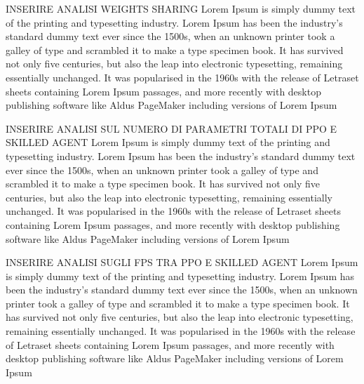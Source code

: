 


INSERIRE ANALISI WEIGHTS SHARING
Lorem Ipsum is simply dummy text of the printing and typesetting industry. Lorem Ipsum has been the industry's standard dummy text ever since the 1500s, when an unknown printer took a galley of type and scrambled it to make a type specimen book. It has survived not only five centuries, but also the leap into electronic typesetting, remaining essentially unchanged. It was popularised in the 1960s with the release of Letraset sheets containing Lorem Ipsum passages, and more recently with desktop publishing software like Aldus PageMaker including versions of Lorem Ipsum

INSERIRE ANALISI SUL NUMERO DI PARAMETRI TOTALI DI PPO E SKILLED AGENT
Lorem Ipsum is simply dummy text of the printing and typesetting industry. Lorem Ipsum has been the industry's standard dummy text ever since the 1500s, when an unknown printer took a galley of type and scrambled it to make a type specimen book. It has survived not only five centuries, but also the leap into electronic typesetting, remaining essentially unchanged. It was popularised in the 1960s with the release of Letraset sheets containing Lorem Ipsum passages, and more recently with desktop publishing software like Aldus PageMaker including versions of Lorem Ipsum

INSERIRE ANALISI SUGLI FPS TRA PPO E SKILLED AGENT
Lorem Ipsum is simply dummy text of the printing and typesetting industry. Lorem Ipsum has been the industry's standard dummy text ever since the 1500s, when an unknown printer took a galley of type and scrambled it to make a type specimen book. It has survived not only five centuries, but also the leap into electronic typesetting, remaining essentially unchanged. It was popularised in the 1960s with the release of Letraset sheets containing Lorem Ipsum passages, and more recently with desktop publishing software like Aldus PageMaker including versions of Lorem Ipsum

